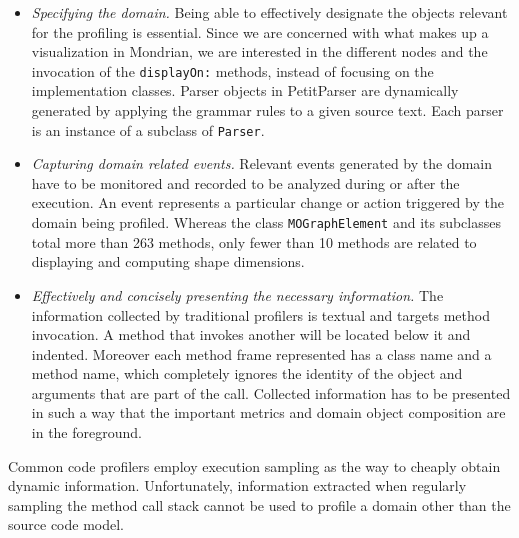 \documentclass[runningheads]{llncs}
\newcommand{\ct}{\lstinline[backgroundcolor=\color{white},basicstyle=\footnotesize\ttfamily]}
\newcommand{\lr}[1]{\nb{Lukas}{orange}{#1}}
\begin{document}
\begin{itemize}
\item \emph{Specifying the domain.} Being able to effectively designate the objects relevant for the profiling is essential.
Since we are concerned with what makes up a visualization in Mondrian, we are interested in the different nodes and the invocation of the \ct{displayOn:} methods, instead of focusing on the implementation classes. 
Parser objects in PetitParser are dynamically generated by applying the grammar rules to a given source text. Each parser is an instance of a subclass of \ct{Parser}. 

\item \emph{Capturing domain related events.}
Relevant events generated by the domain have to be monitored and recorded to be analyzed during or after the execution. An event represents a particular change or action triggered by the domain being profiled. 
Whereas the class \ct{MOGraphElement} and its subclasses total more than 263 methods, only fewer than 10 methods are related to displaying and computing shape dimensions. 

 
\item \emph{Effectively and concisely presenting the necessary information.} 
The information collected by traditional profilers is textual and targets method invocation. A method that invokes another will be located below it and indented. Moreover each method frame represented has a class name and a method name, which completely ignores the identity of the object and arguments that are part of the call.
Collected information has to be presented in such a way that the important metrics and domain object composition are in the foreground.  

\end{itemize}


Common code profilers employ execution sampling as the way to cheaply obtain dynamic information. Unfortunately, information extracted when regularly sampling the method call stack cannot be used to profile a domain other than the source code model.
\end{document}
